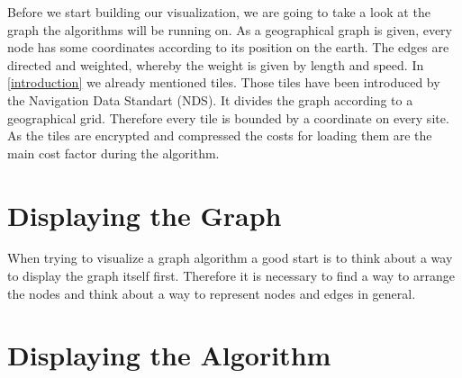 \documentclass
[
	paper = a4,
    pagesize,
	12 pt,
	oneside,                       %
    open = right,
	DIV = calc,
	BCOR = 0 mm,                   %
	bibtotoc
]
{scrbook}
\begin{document}
Before we start building our visualization, we are going to take a look at the graph the algorithms will be running on.
As a geographical graph is given, every node has some coordinates according to its position on the earth.
The edges are directed and weighted, whereby the weight is given by length and speed.
In \ref{introduction} we already mentioned tiles.
Those tiles have been introduced by the Navigation Data Standart (NDS). It divides the graph according to a geographical grid.
Therefore every tile is bounded by a coordinate on every site.
As the tiles are encrypted and compressed the costs for loading them are the main cost factor during the algorithm.



\section{Displaying the Graph}


When trying to visualize a graph algorithm a good start is to think about a way to display the graph itself first.
Therefore it is necessary to find a way to arrange the nodes and think about a way to represent nodes and edges in general.



\section{Displaying the Algorithm}
\end{document}
